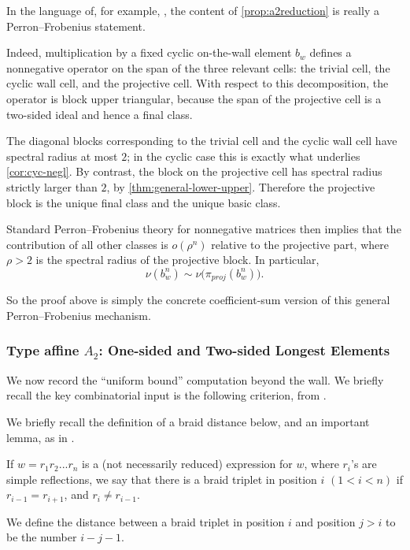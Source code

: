 \documentclass[a4paper,11pt]{amsart}
\newcommand{\nuop}{\nu}
\numberwithin{equation}{subsection}
\theoremstyle{definition}
\theoremstyle{remark}
\begin{document}
\begin{Remark}\label{rem:a2reduction-pf}
In the language of, for example, \cite{LaTuVa-growth-pfdim,LaTuVa-growth-pfdim-inf}, the content of \autoref{prop:a2reduction} is really a Perron--Frobenius statement.

Indeed, multiplication by a fixed cyclic on-the-wall element $b_w$ defines a nonnegative operator on the span of the three relevant cells: the trivial cell, the cyclic wall cell, and the projective cell. With respect to this decomposition, the operator is block upper triangular, because the span of the projective cell is a two-sided ideal and hence a final class.

The diagonal blocks corresponding to the trivial cell and the cyclic wall cell have spectral radius at most $2$; in the cyclic case this is exactly what underlies \autoref{cor:cyc-negl}. By contrast, the block on the projective cell has spectral radius strictly larger than $2$, by \autoref{thm:general-lower-upper}. Therefore the projective block is the unique final class and the unique basic class.

Standard Perron--Frobenius theory for nonnegative matrices then implies that the contribution of all other classes is $o(\rho^n)$ relative to the projective part, where $\rho>2$ is the spectral radius of the projective block. In particular,
\[
\nuop(b_w^n)\sim \nuop\bigl(\pi_{proj}(b_w^n)\bigr).
\]

So the proof above is simply the concrete coefficient-sum version of this general Perron--Frobenius mechanism.
\end{Remark}

\subsubsection{Type affine \texorpdfstring{$A_2$}{A2}: One-sided and Two-sided Longest Elements}\label{sec:a2results}

We now record the ``uniform bound'' computation beyond the wall. We briefly recall the key combinatorial input is the following criterion, from \cite{LiPa}.

We briefly recall the definition of a braid distance below, and an important lemma, as in \cite{LiPa}.

\begin{Definition}\label{def:braid-triplets} If $w = r_1r_2...r_n$ is a (not necessarily reduced) expression for $w$, where $r_i$'s are simple reflections, we say that there is a braid triplet in position $i$ $(1 < i < n)$ if $r_{i-1} = r_{i+1}$, and $r_i \neq r_{i-1}$. 

We define the distance between a braid triplet in position $i$ and position $j > i$ to be the number $i-j-1$.
\end{Definition}
\end{document}

